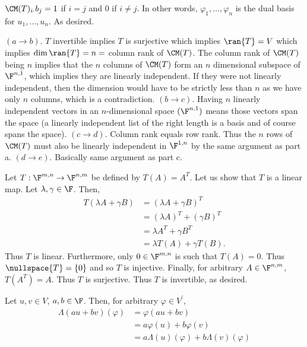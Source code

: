 \documentclass{book}
\begin{document}
\begin{enumerate}[label=\arabic*)]
      $\CM(T)_{i\cdot}b_j = 1$ if $i = j$ and $0$ if $i \neq j$. In other words, $\varphi_1, \dots, \varphi_n$ is the dual basis for $u_1, \dots, u_n$. As desired.
    \ii
      \begin{enumerate}[label=\alph*)]
        \ii $(a \to b)$. $T$ invertible implies $T$ is surjective which implies $\ran{T} = V$ which implies $\dim{\ran{T}} = n = $ column rank of $\CM(T)$. The column rank of $\CM(T)$ being $n$
        implies that the $n$ columns of $\CM(T)$ form an $n$ dimensional subspace of $\F^{n, 1}$, which implies they are linearly independent. If they were not linearly independent, then the
        dimension would have to be strictly less than $n$ as we have only $n$ columns, which is a contradiction.
        \ii $(b \to c)$. Having $n$ linearly independent vectors in an $n$-dimensional space $(\F^{n, 1})$ means those vectors span the space (a linearly independent list of the right length
        is a basis and of course spans the space).
        \ii $(c \to d)$. Column rank equals row rank. Thus the $n$ rows of $\CM(T)$ must also be linearly independent in $\F^{1, n}$ by the same argument as part a.
        \ii $(d \to e)$. Basically same argument as part c.
      \end{enumerate}
    \ii
      Let $T: \F^{m, n} \to \F^{n, m}$ be defined by $T(A) = A^T$. Let us show that $T$ is a linear map. Let $\lambda, \gamma \in \F$. Then,
      \begin{align*}
        T(\lambda A + \gamma B) & = (\lambda A + \gamma B)^T \\
        & = (\lambda A)^T + (\gamma B)^T \\
        & = \lambda A^T + \gamma B^T \\
        & = \lambda T(A) + \gamma T(B).
      \end{align*}
      Thus $T$ is linear. Furthermore, only $0 \in \F^{m, n}$ is such that $T(A) = 0$. Thus $\nullspace{T} = \{0\}$ and so $T$ is injective. Finally, for arbitrary $A \in \F^{n, m}$, $T(A^T)
      = A$. Thus $T$ is surjective. Thus $T$ is invertible, as desired.
    \ii
      \begin{enumerate}[label=\alph*)]
        \ii 
          Let $u, v  \in V$, $a, b \in \F$. Then, for arbitrary $\varphi \in V^{\prime}$,
          \begin{align*}
            \Lambda(au + bv)(\varphi) & = \varphi(au + bv) \\
            & = a\varphi(u) + b\varphi(v) \\
            & = a\Lambda(u)(\varphi) + b\Lambda(v)(\varphi)

\end{align*}
\end{enumerate}
\end{enumerate}
\end{document}
